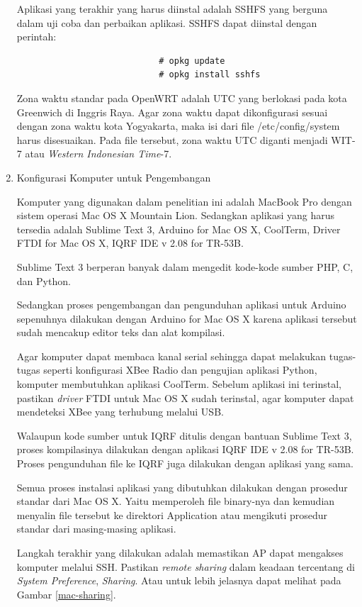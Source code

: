 \begin{enumerate}
					Aplikasi yang terakhir yang harus diinstal adalah SSHFS yang berguna dalam uji coba dan perbaikan aplikasi. SSHFS dapat diinstal dengan perintah:
					\begingroup
					    \fontsize{10pt}{12pt}\selectfont
					    \begin{verbatim}
							# opkg update
							# opkg install sshfs
					    \end{verbatim}  
					\endgroup

					Zona waktu standar pada OpenWRT adalah UTC yang berlokasi pada kota Greenwich di Inggris Raya. Agar zona waktu dapat dikonfigurasi sesuai dengan zona waktu kota Yogyakarta, maka isi dari file /etc/config/system harus disesuaikan. Pada file tersebut, zona waktu UTC diganti menjadi WIT-7 atau \emph{Western Indonesian Time}-7.

				\item Konfigurasi Komputer untuk Pengembangan

					Komputer yang digunakan dalam penelitian ini adalah MacBook Pro dengan sistem operasi Mac OS X Mountain Lion. Sedangkan aplikasi yang harus tersedia adalah Sublime Text 3, Arduino for Mac OS X, CoolTerm, Driver FTDI for Mac OS X, IQRF IDE v 2.08 for TR-53B.

					Sublime Text 3 berperan banyak dalam mengedit kode-kode sumber PHP, C, dan Python.

					Sedangkan proses pengembangan dan pengunduhan aplikasi untuk Arduino sepenuhnya dilakukan dengan Arduino for Mac OS X karena aplikasi tersebut sudah mencakup editor teks dan alat kompilasi.

					Agar komputer dapat membaca kanal serial sehingga dapat melakukan tugas-tugas seperti konfigurasi XBee Radio dan pengujian aplikasi Python, komputer membutuhkan aplikasi CoolTerm. Sebelum aplikasi ini terinstal, pastikan \emph{driver} FTDI untuk Mac OS X sudah terinstal, agar komputer dapat mendeteksi XBee yang terhubung melalui USB.

					Walaupun kode sumber untuk IQRF ditulis dengan bantuan Sublime Text 3, proses kompilasinya dilakukan dengan aplikasi IQRF IDE v 2.08 for TR-53B. Proses pengunduhan file ke IQRF juga dilakukan dengan aplikasi yang sama.

					Semua proses instalasi aplikasi yang dibutuhkan dilakukan dengan prosedur standar dari Mac OS X. Yaitu memperoleh file binary-nya dan kemudian menyalin file tersebut ke direktori Application atau mengikuti prosedur standar dari masing-masing aplikasi.

					Langkah terakhir yang dilakukan adalah memastikan AP dapat mengakses komputer melalui SSH. Pastikan \emph{remote sharing} dalam keadaan tercentang di \emph{System Preference}, \emph{Sharing}. Atau untuk lebih jelasnya dapat melihat pada Gambar \ref{mac-sharing}.


\end{enumerate}
